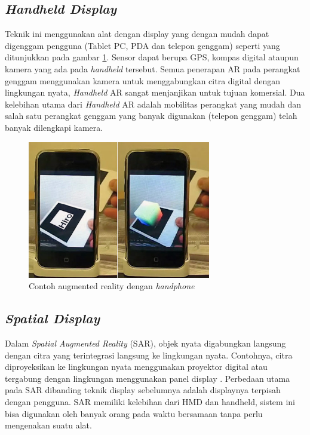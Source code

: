 
\subsection {\textit{Handheld Display}}
\label{subsec:handheld_display}
Teknik ini menggunakan alat dengan display yang dengan mudah dapat digenggam pengguna (Tablet PC, PDA dan telepon genggam) seperti yang ditunjukkan pada gambar \ref{fig:AR_phone}. Sensor dapat berupa GPS, kompas digital ataupun kamera yang ada pada \textit{handheld} tersebut. Semua penerapan AR pada perangkat genggam menggunakan kamera untuk menggabungkan citra digital dengan lingkungan nyata, \textit{Handheld} AR sangat menjanjikan untuk tujuan komersial. Dua kelebihan utama dari \textit{Handheld} AR adalah mobilitas perangkat yang mudah dan salah satu perangkat genggam yang banyak digunakan (telepon genggam) telah banyak dilengkapi kamera.

\begin{figure}[h!]
	\centering
		\includegraphics[width=8cm]{images/handphone_AR}
	\caption{\label{fig:AR_phone} Contoh augmented reality dengan \textit{handphone}}
\end{figure}

\subsection {\textit{Spatial Display}}
\label{subsec:spatial_display}
Dalam \textit{Spatial Augmented Reality} (SAR), objek nyata digabungkan langsung dengan citra yang terintegrasi langsung ke lingkungan nyata. Contohnya, citra diproyeksikan ke lingkungan nyata menggunakan proyektor digital atau tergabung dengan lingkungan menggunakan panel display \cite{Ramesh1998}. Perbedaan utama pada SAR dibanding teknik display sebelumnya adalah displaynya terpisah dengan pengguna. SAR memiliki kelebihan dari HMD dan handheld, sistem ini bisa digunakan oleh banyak orang pada waktu bersamaan tanpa perlu mengenakan suatu alat.

